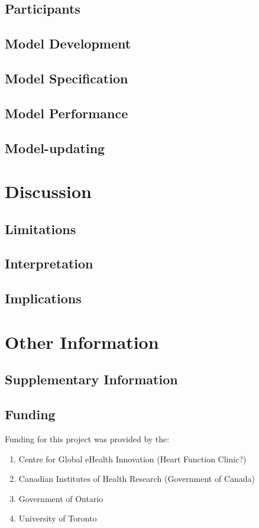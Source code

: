 \documentclass[]{article}
\begin{document}
\subsection{Participants} %

\subsection{Model Development} %

\subsection{Model Specification} %

\subsection{Model Performance} %

\subsection{Model-updating} %


\section{Discussion}
\subsection{Limitations} %

\subsection{Interpretation} %

\subsection{Implications} %

\section{Other Information}
\subsection{Supplementary Information} %

\subsection{Funding} %
Funding for this project was provided by the:
\begin{enumerate}[label=,itemsep=0mm]
	\item Centre for Global eHealth Innovation (Heart Function Clinic?)  %
	\item Canadian Institutes of Health Research (Government of Canada)
	\item Government of Ontario
	\item University of Toronto
\end{enumerate} 
\end{document}

